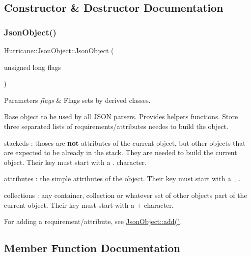 \subsection{Constructor \& Destructor Documentation}
\mbox{\label{classHurricane_1_1JsonObject_a57d9c022204b30d4b253c2588f2c1215}} 
\subsubsection{\texorpdfstring{Json\+Object()}{JsonObject()}}
{\footnotesize\ttfamily Hurricane\+::\+Json\+Object\+::\+Json\+Object (\begin{DoxyParamCaption}\item[{unsigned long}]{flags }\end{DoxyParamCaption})}


\begin{DoxyParams}{Parameters}
{\em flags} & Flags sets by derived classes.\\
\hline
\end{DoxyParams}
Base object to be used by all J\+S\+ON parsers. Provides helpers functions. Store three separated lists of requirements/attributes needes to build the object.
\begin{DoxyItemize}
\item {\ttfamily stackeds} \+: thoses are {\bfseries not} attributes of the current object, but other objects that are expected to be already in the stack. They are needed to build the current object. Their key must start with a {\ttfamily \textquotesingle{}}.\textquotesingle{} character.
\item {\ttfamily attributes} \+: the simple attributes of the object. Their key must start with a {\ttfamily \textquotesingle{}\+\_\+\textquotesingle{}}.
\item {\ttfamily collections} \+: any container, collection or whatever set of other objects part of the current object. Their key must start with a {\ttfamily \textquotesingle{}+\textquotesingle{}} character.
\end{DoxyItemize}

For adding a requirement/attribute, see \hyperlink{classHurricane_1_1JsonObject_a39ed04c118b19f1b6010b7f3336c360f}{Json\+Object\+::add()}. 

\subsection{Member Function Documentation}
\mbox{\label{classHurricane_1_1JsonObject_a8f0949b75f5900e4ef87196e949cfa6b}} 
